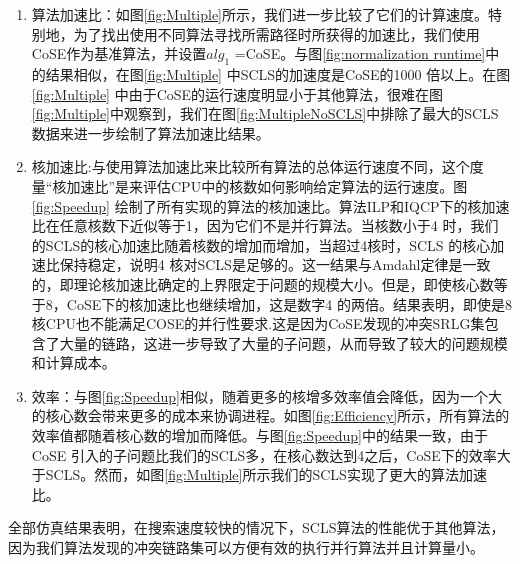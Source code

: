 \begin{enumerate}
   \item   算法加速比：如图\ref{fig:Multiple}所示，我们进一步比较了它们的计算速度。特别地，为了找出使用不同算法寻找所需路径时所获得的加速比，我们使用CoSE作为基准算法，并设置$alg_1$ =CoSE。与图\ref{fig:normalization runtime}中的结果相似，在图\ref{fig:Multiple} 中SCLS的加速度是CoSE的1000 倍以上。在图\ref{fig:Multiple} 中由于CoSE的运行速度明显小于其他算法，很难在图\ref{fig:Multiple}中观察到，我们在图\ref{fig:MultipleNoSCLS}中排除了最大的SCLS 数据来进一步绘制了算法加速比结果。
   \item 核加速比:与使用算法加速比来比较所有算法的总体运行速度不同，这个度量“核加速比”是来评估CPU中的核数如何影响给定算法的运行速度。图\ref{fig:Speedup} 绘制了所有实现的算法的核加速比。算法ILP和IQCP下的核加速比在任意核数下近似等于1，因为它们不是并行算法。当核数小于4 时，我们的SCLS的核心加速比随着核数的增加而增加，当超过4核时，SCLS 的核心加速比保持稳定，说明4 核对SCLS是足够的。这一结果与Amdahl定律\cite{amdahl1967validity}是一致的，即理论核加速比确定的上界限定于问题的规模大小。但是，即使核心数等于8，CoSE下的核加速比也继续增加，这是数字4 的两倍。结果表明，即使是8核CPU也不能满足COSE的并行性要求.这是因为CoSE发现的冲突SRLG集包含了大量的链路，这进一步导致了大量的子问题，从而导致了较大的问题规模和计算成本。
    \item 效率：与图\ref{fig:Speedup}相似，随着更多的核增多效率值会降低，因为一个大的核心数会带来更多的成本来协调进程。如图\ref{fig:Efficiency}所示，所有算法的效率值都随着核心数的增加而降低。与图\ref{fig:Speedup}中的结果一致，由于CoSE 引入的子问题比我们的SCLS多，在核心数达到4之后，CoSE下的效率大于SCLS。然而，如图\ref{fig:Multiple}所示我们的SCLS实现了更大的算法加速比。
\end{enumerate}

全部仿真结果表明，在搜索速度较快的情况下，SCLS算法的性能优于其他算法，因为我们算法发现的冲突链路集可以方便有效的执行并行算法并且计算量小。

